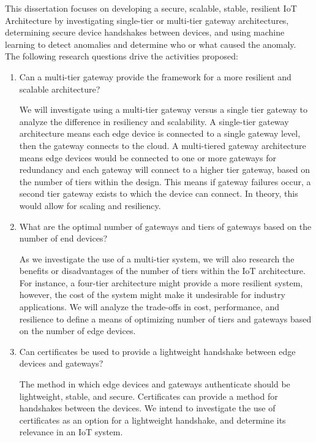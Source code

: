 \documentclass[../main.tex]{subfiles}
\begin{document}
This dissertation focuses on developing a secure, scalable, stable, resilient IoT Architecture by investigating single-tier or multi-tier gateway architectures, determining secure device handshakes between devices, and using machine learning to detect anomalies and determine who or what caused the anomaly. The following research questions drive the activities proposed:

\begin{enumerate}
    \item Can a multi-tier gateway provide the framework for a more resilient and scalable architecture?

We will investigate using a multi-tier gateway versus a single tier gateway to analyze the difference in resiliency and scalability. A single-tier gateway architecture means each edge device is connected to a single gateway level, then the gateway connects to the cloud. A multi-tiered gateway architecture means edge devices would be connected to one or more gateways for redundancy and each gateway will connect to a higher tier gateway, based on the number of tiers within the design. This means if gateway failures occur, a second tier gateway exists to which the device can connect. In theory, this would allow for scaling and resiliency. 

    \item What are the optimal number of gateways and tiers of gateways based on the number of end devices?  
    
As we investigate the use of a multi-tier system, we will also research the benefits or disadvantages of the number of tiers within the IoT architecture. For instance, a four-tier architecture might provide a more resilient system, however, the cost of the system might make it undesirable for industry applications. We will analyze the trade-offs in cost, performance, and resilience to define a means of optimizing number of tiers and gateways based on the number of edge devices.


    \item Can certificates be used to provide a lightweight handshake between edge devices and gateways?

The method in which edge devices and gateways authenticate should be lightweight, stable, and secure. Certificates can provide a method for handshakes between the devices. We intend to investigate the use of certificates as an option for a lightweight handshake, and determine its relevance in an IoT system.



\end{enumerate}
\end{document}
